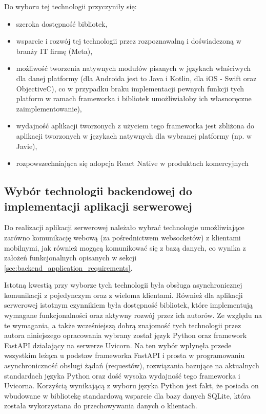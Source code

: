 \documentclass[../main.tex]{subfiles}
\begin{document}
Do wyboru tej technologii przyczyniły się:
\begin{itemize}
	\item szeroka dostępność bibliotek,
	\item wsparcie i rozwój tej technologii przez rozpoznawalną i doświadczoną w branży IT firmę (Meta),
	\item możliwość tworzenia natywnych modułów pisanych w językach właściwych dla danej platformy (dla Androida jest to Java i Kotlin, dla iOS - Swift oraz ObjectiveC), co w przypadku braku implementacji pewnych funkcji tych platform w ramach frameworka i bibliotek umożliwiałoby ich własnoręczne zaimplementowanie),
	\item wydajność aplikacji tworzonych z użyciem tego frameworka jest zbliżona do aplikacji tworzonych w językach natywnych dla wybranej platformy (np. w Javie)\cite{android_vs_react_native_performance_comparison},
	\item rozpowszechniająca się adopcja React Native w produktach komercyjnych\cite{reacti_native_use_statistics}
\end{itemize}

\subsection{Wybór technologii backendowej do implementacji aplikacji serwerowej}

Do realizacji aplikacji serwerowej należało wybrać technologie umożliwiające zarówno komunikację webową (za pośrednictwem websocketów) z klientami mobilnymi, jak również mogącą komunikować się z bazą danych, co wynika z założeń funkcjonalnych opisanych w sekcji \ref{sec:backend_application_requirements}.

Istotną kwestią przy wyborze tych technologii była obsługa asynchronicznej komunikacji z pojedynczym oraz z wieloma klientami. Również dla aplikacji serwerowej istotnym czynnikiem była dostępność bibliotek, które implementują wymagane funkcjonalności oraz aktywny rozwój przez ich autorów. Ze względu na te wymagania, a także wcześniejszą dobrą znajomość tych technologii przez autora niniejszego opracowania wybrany został język Python oraz framework FastAPI działający na serwerze Uvicorn. Na ten wybór wpłynęła przede wszystkim leżąca u podstaw frameworka FastAPI i prosta w programowaniu asynchroniczność obsługi żądań (requestów), rozwiązania bazujące na aktualnych standardach języka Python oraz dość wysoka wydajność tego frameworka i Uvicorna\cite{fastapi_performance}. Korzyścią wynikającą z wyboru języka Python jest fakt, że posiada on wbudowane w bibliotekę standardową wsparcie dla bazy danych SQLite, która została wykorzystana do przechowywania danych o klientach.
\end{document}
